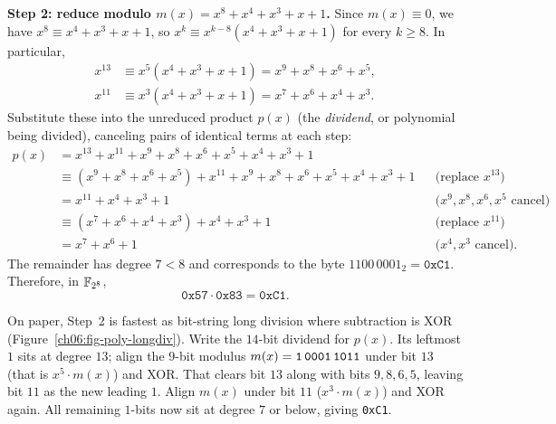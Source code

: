 \textbf{Step 2: reduce modulo $m(x) = x^8+x^4+x^3+x+1$.} Since $m(x) \equiv 0$,
we have $x^8 \equiv x^4 + x^3 + x + 1$, so $x^k \equiv x^{k-8}(x^4 + x^3 + x +
1)$ for every $k \ge 8$. In particular,
\begin{align*}
x^{13} &\equiv x^{5}(x^4 + x^3 + x + 1) = x^{9}+x^{8}+x^{6}+x^{5},\\
x^{11} &\equiv x^{3}(x^4 + x^3 + x + 1) = x^{7}+x^{6}+x^{4}+x^{3}.
\end{align*}
Substitute these into the unreduced product $p(x)$ (the \emph{dividend}, or
polynomial being divided), canceling pairs of identical terms at each step:
\begin{align*}
p(x) &= x^{13} + x^{11} + x^{9} + x^{8} + x^{6} + x^{5} + x^{4} + x^{3} + 1 \\
     &\equiv (x^{9}+x^{8}+x^{6}+x^{5}) + x^{11} + x^{9} + x^{8} + x^{6} + x^{5} + x^{4} + x^{3} + 1
       && \text{(replace $x^{13}$)} \\
     &= x^{11} + x^{4} + x^{3} + 1
       && \text{($x^9, x^8, x^6, x^5$ cancel)} \\
     &\equiv (x^{7}+x^{6}+x^{4}+x^{3}) + x^{4} + x^{3} + 1
       && \text{(replace $x^{11}$)} \\
     &= x^{7} + x^{6} + 1
       && \text{($x^4, x^3$ cancel).}
\end{align*}
The remainder has degree $7 < 8$ and corresponds to the byte $1100\,0001_2 =
\texttt{0xC1}$. Therefore, in $\mathbb{F}_{2^8}$,
\[
\texttt{0x57} \cdot \texttt{0x83} = \texttt{0xC1}.
\]

\begin{walkbox}
On paper, Step~2 is fastest as bit-string long division where subtraction is
XOR (Figure~\ref{ch06:fig-poly-longdiv}). Write the $14$-bit dividend for
$p(x)$. Its leftmost $1$ sits at degree $13$; align the $9$-bit modulus
$m(x) = \texttt{1\,0001\,1011}$ under bit $13$ (that is $x^5 \cdot m(x)$) and
XOR. That clears bit $13$ along with bits $9,8,6,5$, leaving bit $11$ as the
new leading $1$. Align $m(x)$ under bit $11$ ($x^3 \cdot m(x)$) and XOR again.
All remaining $1$-bits now sit at degree $7$ or below, giving \texttt{0xC1}.
\end{walkbox}

